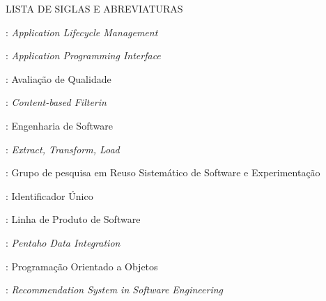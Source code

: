 \clearpage
\thispagestyle{empty}

\noindent{\large\bf\dadoTituloAbs}
\noindent{\large\dadoSubTituloAbs}

\normalsize
\begin{center}
	LISTA DE SIGLAS E ABREVIATURAS
\end{center}


: \textit{Application Lifecycle Management}

: \textit{Application Programming Interface}

: Avaliação de Qualidade

: \textit{Content-based Filterin}

: Engenharia de Software

: \textit{Extract, Transform, Load}

: Grupo de pesquisa em Reuso Sistemático de Software e Experimentação

: Identificador Único

: Linha de Produto de Software

: \textit{Pentaho Data Integration}

: Programação Orientado a Objetos

: \textit{Recommendation System in Software Engineering}


\pagebreak
